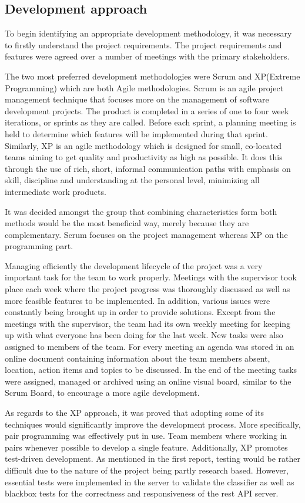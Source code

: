 \subsection{Development approach} 
To begin identifying an appropriate development methodology, it was necessary to firstly understand 
the project requirements. The project requirements and features were agreed over a number of 
meetings with the primary stakeholders.

The two most preferred development methodologies were 
Scrum and XP(Extreme Programming) which are both Agile methodologies. Scrum is an agile project management technique that focuses more 
on the management of software development projects. The product is completed in a series of one to 
four week iterations, or sprints as they are called. Before each sprint, a planning meeting is held 
to determine which features will be implemented during that sprint. Similarly, XP is an agile 
methodology which is designed for small, co-located teams aiming to get quality and productivity as 
high as possible. It does this through the use of rich, short, informal communication paths with 
emphasis on skill, discipline and understanding at the personal level, minimizing all intermediate 
work products. 

It was decided amongst the group that combining characteristics form both methods 
would be the most beneficial way, merely because they are complementary. Scrum focuses on the project management 
whereas XP on the programming part.\cite{ScrumXP}

Managing efficiently the development lifecycle of the project was a very 
important task for the team to work properly. Meetings with the supervisor took place each week 
where the project progress was thoroughly discussed as well as more feasible features to be 
implemented. In addition, various issues were constantly being brought up in order to provide solutions. Except from 
the meetings with the supervisor, the team had its own weekly meeting for keeping up with what 
everyone has been doing for the last week. New tasks were also assigned to members of the team. For 
every meeting an agenda was stored in an online document containing information about the team 
members absent, location, action items and topics to be discussed. In the end of the meeting tasks 
were assigned, managed or archived using an online visual board, similar to the Scrum Board, to 
encourage a more agile development.

As regards to the XP approach, it was proved that adopting 
some of its techniques would significantly improve the development process. More specifically, pair 
programming was effectively put in use. Team members where working in pairs whenever possible to 
develop a single feature. Additionally, XP promotes test-driven development. As mentioned in the 
first report, testing would be rather difficult due to the nature of the project being partly 
research based. However, essential tests were implemented in the server to validate the classifier 
as well as blackbox tests for the correctness and responsiveness of the rest API server. 

